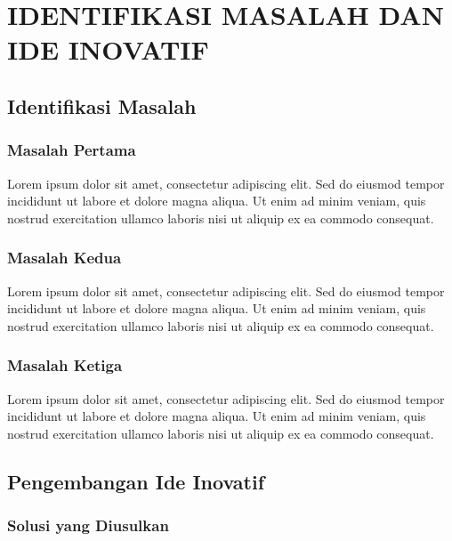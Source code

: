 \chapter{IDENTIFIKASI MASALAH DAN IDE INOVATIF}

\section{Identifikasi Masalah}

\subsection{Masalah Pertama}


Lorem ipsum dolor sit amet, consectetur adipiscing elit. Sed do eiusmod tempor incididunt ut labore et dolore magna aliqua. Ut enim ad minim veniam, quis nostrud exercitation ullamco laboris nisi ut aliquip ex ea commodo consequat.

\subsection{Masalah Kedua}


Lorem ipsum dolor sit amet, consectetur adipiscing elit. Sed do eiusmod tempor incididunt ut labore et dolore magna aliqua. Ut enim ad minim veniam, quis nostrud exercitation ullamco laboris nisi ut aliquip ex ea commodo consequat.

\subsection{Masalah Ketiga}


Lorem ipsum dolor sit amet, consectetur adipiscing elit. Sed do eiusmod tempor incididunt ut labore et dolore magna aliqua. Ut enim ad minim veniam, quis nostrud exercitation ullamco laboris nisi ut aliquip ex ea commodo consequat.

\section{Pengembangan Ide Inovatif}

\subsection{Solusi yang Diusulkan}

